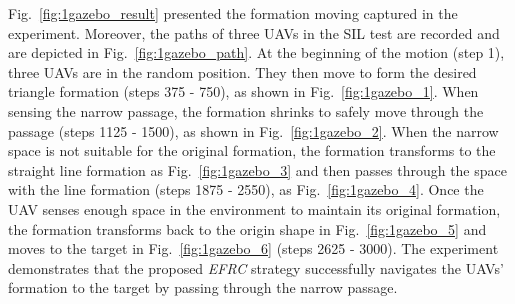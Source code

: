 Fig.~\ref{fig:1gazebo_result} presented the formation moving captured in the experiment. Moreover, the paths of three UAVs in the SIL test are recorded and are depicted in Fig.~\ref{fig:1gazebo_path}. At the beginning of the motion (step 1), three UAVs are in the random position. They then move to form the desired triangle formation (steps 375 - 750), as shown in Fig.~\ref{fig:1gazebo_1}. When sensing the narrow passage, the formation shrinks to safely move through the passage (steps 1125 - 1500), as shown in Fig.~\ref{fig:1gazebo_2}. When the narrow space is not suitable for the original formation, the formation transforms to the straight line formation as Fig.~\ref{fig:1gazebo_3} and then passes through the space with the line formation (steps 1875 - 2550), as Fig.~\ref{fig:1gazebo_4}. Once the UAV senses enough space in the environment to maintain its original formation, the formation transforms back to the origin shape in Fig.~\ref{fig:1gazebo_5} and moves to the target in Fig.~\ref{fig:1gazebo_6} (steps 2625 - 3000). The experiment demonstrates that the proposed \textit{EFRC} strategy successfully navigates the UAVs' formation to the target by passing through the narrow passage.





